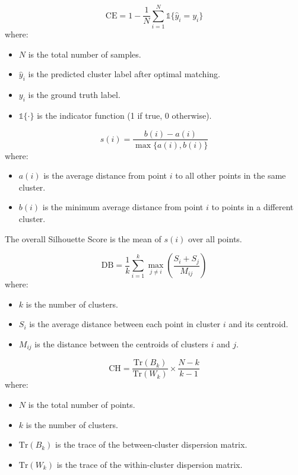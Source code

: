 \documentclass[
	10pt,
	parskip=half-,	
	paper=a4,
	english
	]{scrartcl}
\begin{document}
\begin{equation}
    \text{CE} = 1 - \frac{1}{N} \sum_{i=1}^{N} \mathbb{1}\{ \hat{y}_i = y_i \}
    \label{eq10}
\end{equation}
where:
\begin{itemize}
    \item $N$ is the total number of samples.
    \item $\hat{y}_i$ is the predicted cluster label after optimal matching.
    \item $y_i$ is the ground truth label.
    \item $\mathbb{1}\{\cdot\}$ is the indicator function (1 if true, 0 otherwise).
\end{itemize}

\begin{equation}
    s(i) = \frac{b(i) - a(i)}{\max\{a(i), b(i)\}}
    \label{eq11}
\end{equation}
where:
\begin{itemize}
    \item $a(i)$ is the average distance from point $i$ to all other points in the same cluster.
    \item $b(i)$ is the minimum average distance from point $i$ to points in a different cluster.
\end{itemize}
The overall Silhouette Score is the mean of $s(i)$ over all points.

\begin{equation}
    \text{DB} = \frac{1}{k} \sum_{i=1}^{k} \max_{j \neq i} \left( \frac{S_i + S_j}{M_{ij}} \right)
    \label{eq12}
\end{equation}
where:
\begin{itemize}
    \item $k$ is the number of clusters.
    \item $S_i$ is the average distance between each point in cluster $i$ and its centroid.
    \item $M_{ij}$ is the distance between the centroids of clusters $i$ and $j$.
\end{itemize}

\begin{equation}
    \text{CH} = \frac{\text{Tr}(B_k)}{\text{Tr}(W_k)} \times \frac{N - k}{k-1}
    \label{eq13}
\end{equation}
where:
\begin{itemize}
    \item $N$ is the total number of points.
    \item $k$ is the number of clusters.
    \item $\text{Tr}(B_k)$ is the trace of the between-cluster dispersion matrix.
    \item $\text{Tr}(W_k)$ is the trace of the within-cluster dispersion matrix.
\end{itemize}
\end{document}

